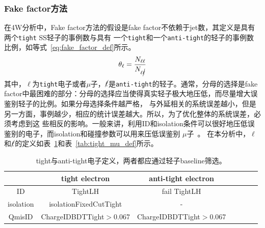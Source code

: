 \subsubsection{Fake factor方法}
在4W分析中，Fake factor方法的假设是fake factor不依赖于jet数，其定义是具有两个\texttt{tight} SS轻子的事例数与具有
一个\texttt{tight}和一个\texttt{anti-tight}的轻子的事例数比例，如等式~\ref{eq:fake_factor_def}所示。
\begin{equation}
\theta_{\ell}=\frac{N_{\ell \ell}}{N_{\ell \cancel{\ell}}}
\label{eq:fake_factor_def}
\end{equation}
其中，$\ell$为\texttt{tight}电子或者$\mu$子，$\cancel{\ell}$是\texttt{anti-tight}的轻子。通常，分母的选择是fake 
factor中最困难的部分：分母的选择应当使得真实轻子极大地压低，而尽量增大误鉴别轻子的比例。如果分母选择条件越严格，
与外延相关的系统误差越小，但是另一方面，事例越少，相应的统计误差越大。所以，为了优化整体的系统误差，必须考虑到这
些相反的影响。一般来讲，利用ID和isolation条件可以很好地压低误鉴别的电子，而isolation和碰撞参数可以用来压低误鉴别
$\mu$子~\cite{Alison2015}。
在本分析中，$\ell$和$\cancel{\ell}$的定义如表~\ref{tab:tight_ele_def}和表~\ref{tab:tight_mu_def}所示。
\begin{table}[!ht]
\begin{center}
\begin{tabular}{c|cccccc}
\hline
  &tight electron    &anti-tight electron  \\
\hline
ID  &TightLH  &fail TightLH \\
isolation &isolationFixedCutTight  &- \\
QmisID          &ChargeIDBDTTight$>$0.067  &ChargeIDBDTTight$>$0.067 \\
\hline
\end{tabular}
\caption{tight与anti-tight电子定义，两者都应通过轻子baseline筛选。}
\label{tab:tight_ele_def}
\end{center}
\end{table}

